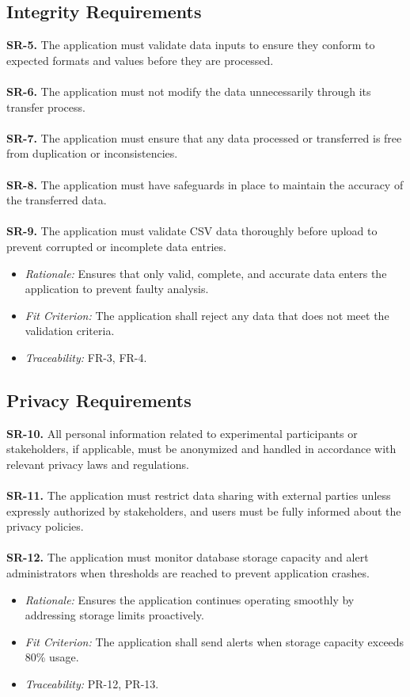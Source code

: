 \documentclass{article}
\begin{document}
\subsection{Integrity Requirements}
\textbf{SR-5.} The application must validate data inputs to ensure they conform
  to expected formats and values before they are processed. \ \\
\ \\
\textbf{SR-6.} The application must not modify the data unnecessarily through
  its transfer process. \ \\
\ \\
\textbf{SR-7.} The application must ensure that any data processed or
  transferred is free from duplication or inconsistencies. \ \\
\ \\
\textbf{SR-8.} The application must have safeguards in place to maintain the
  accuracy of the transferred data. \ \\
  \ \\
\textbf{SR-9.} The application must validate CSV data thoroughly before upload to
prevent corrupted or incomplete data entries.
  \begin{itemize}
    \item \textit{Rationale:} Ensures that only valid, complete, and accurate
    data enters the application to prevent faulty analysis.
    \item \textit{Fit Criterion:} The application shall reject any data that
    does not meet the validation criteria.
    \item \textit{Traceability:} FR-3, FR-4.
  \end{itemize}

\subsection{Privacy Requirements}
\textbf{SR-10.} All personal information related to experimental participants or
  stakeholders, if applicable, must be anonymized and handled in accordance with
  relevant privacy laws and regulations. \ \\
\ \\
\textbf{SR-11.} The application must restrict data sharing with external parties
  unless expressly authorized by stakeholders, and users must be fully informed
  about the privacy policies. \ \\
  \ \\
  \textbf{SR-12.} The application must monitor database storage capacity and alert
  administrators when thresholds are reached to prevent application crashes.
    \begin{itemize}
      \item \textit{Rationale:} Ensures the application continues operating smoothly
      by addressing storage limits proactively.
      \item \textit{Fit Criterion:} The application shall send alerts when storage
      capacity exceeds 80\% usage.
      \item \textit{Traceability:} PR-12, PR-13.
    \end{itemize}
\end{document}

